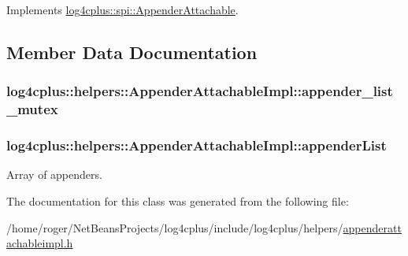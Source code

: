 Implements \hyperlink{classlog4cplus_1_1spi_1_1AppenderAttachable_adf86f941e47a7c400a75408bf42e80ac}{log4cplus\-::spi\-::\-Appender\-Attachable}.



\subsection{Member Data Documentation}
\hypertarget{classlog4cplus_1_1helpers_1_1AppenderAttachableImpl_a2542b14426c5c7a98ca4a5eed51bbbda}{
\subsubsection[{appender\-\_\-list\-\_\-mutex}]{ log4cplus\-::helpers\-::\-Appender\-Attachable\-Impl\-::appender\-\_\-list\-\_\-mutex}}\label{classlog4cplus_1_1helpers_1_1AppenderAttachableImpl_a2542b14426c5c7a98ca4a5eed51bbbda}
\hypertarget{classlog4cplus_1_1helpers_1_1AppenderAttachableImpl_a005e2cff7327ca132a173e088aefe660}{
\subsubsection[{appender\-List}]{ log4cplus\-::helpers\-::\-Appender\-Attachable\-Impl\-::appender\-List\hspace{0.3cm}{\ttfamily [protected]}}}\label{classlog4cplus_1_1helpers_1_1AppenderAttachableImpl_a005e2cff7327ca132a173e088aefe660}
Array of appenders. 

The documentation for this class was generated from the following file\-:\begin{DoxyCompactItemize}
\item 
/home/roger/\-Net\-Beans\-Projects/log4cplus/include/log4cplus/helpers/\hyperlink{appenderattachableimpl_8h}{appenderattachableimpl.\-h}\end{DoxyCompactItemize}
